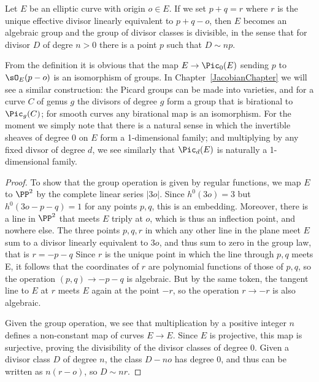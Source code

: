 \begin{proposition}\label{group law} Let $E$ be an elliptic curve with origin $o\in E$.
If we set $p+q = r$ where $r$ is the unique effective divisor linearly equivalent to $p+q-o$, then $E$ becomes an algebraic group
and the group of divisor classes is divisible, in the sense that for divisor $D$ of degre $n>0$
 there is a point $p$ such that $D\sim np$.
 \end{proposition}

\begin{remark}
From the definition it is obvious that 
the map
$E \to \Pic_0(E)$ sending $p$ to $\sO_E(p-o)$ is an isomorphism of groups.
 In Chapter~\ref{JacobianChapter} we will see a similar construction: the Picard groups can be made into
varieties, and for a curve $C$ of genus $g$ the divisors
of degree $g$ form a group that is birational to $\Pic_g(C)$; for smooth curves any birational map is an isomorphism.
For the moment we simply note that there is a natural sense in which the invertible sheaves of degree 0 on $E$
form a 1-dimensional family; and multiplying by any fixed divsor of degree $d$, we see similarly
that $\Pic_d(E)$ is naturally a 1-dimensional family. 
\end{remark}
 
\begin{proof}
To show that the group operation is given by regular functions, we map $E$ to $\PP^2$ by the complete linear series $|3o|$. Since
$h^0(3o) = 3$ but $h^0(3o-p-q) = 1$ for any points $p,q$, this is an embedding. Moreover, there is a line in $\PP^2$ that meets
$E$ triply at $o$, which is thus an inflection point, and nowhere else. The three points $p,q,r$ in which any other line in the plane
meet $E$ sum to a divisor linearly equivalent to $3o$, and thus sum to zero in the group law, that is $r = -p-q$ Since $r$ is the unique
point in which the line
through $p,q$ meets  E, it follows that the coordinates of $r$ are polynomial functions of those of $p,q$, so the operation
$(p,q) \to -p-q$ is algebraic. But by the same token, the tangent line to $E$ at $r$ meets $E$ again at the point $-r$,
so the operation $r\to -r$ is also algebraic.

Given the group operation, we see that multiplication by a positive integer $n$ defines a non-constant map of 
curves $E\to E$. Since $E$ is projective, this map is surjective, proving the divisibility of the divisor classes of degree 0. 
Given a divisor class $D$ of degree $n$, the class $D -no$ has degree 0, and thus can be written as $n(r-o)$, so
$D\sim nr$.
\end{proof}

